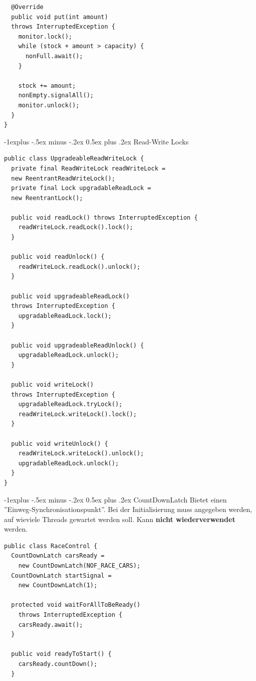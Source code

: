 \documentclass[a4paper, fontsize=6pt]{scrartcl}
\makeatletter
\renewcommand{\subsection}{\@startsection{subsection}{2}{0mm}%
    {-1explus -.5ex minus -.2ex}%
    {0.5ex plus .2ex}%
    {\normalfont\normalsize\bfseries}}
\makeatother
\begin{document}
\begin{multicols*}{5}
\begin{verbatim}
  @Override
  public void put(int amount) 
  throws InterruptedException {
    monitor.lock();
    while (stock + amount > capacity) {
      nonFull.await();
    }

    stock += amount;
    nonEmpty.signalAll();
    monitor.unlock();
  }
}
\end{verbatim}

\subsection{Read-Write Locks}
\begin{verbatim}
public class UpgradeableReadWriteLock {
  private final ReadWriteLock readWriteLock =
  new ReentrantReadWriteLock();
  private final Lock upgradableReadLock = 
  new ReentrantLock();

  public void readLock() throws InterruptedException {
    readWriteLock.readLock().lock();
  }

  public void readUnlock() {
    readWriteLock.readLock().unlock();
  }

  public void upgradeableReadLock() 
  throws InterruptedException {
    upgradableReadLock.lock();
  }

  public void upgradeableReadUnlock() {
    upgradableReadLock.unlock();
  }

  public void writeLock() 
  throws InterruptedException {
    upgradableReadLock.tryLock();
    readWriteLock.writeLock().lock();
  }

  public void writeUnlock() {
    readWriteLock.writeLock().unlock();
    upgradableReadLock.unlock();
  }
}
\end{verbatim}

\subsection{CountDownLatch}
Bietet einen ''Einweg-Synchronisationspunkt''. Bei der Initialisierung muss angegeben werden, auf wieviele Threads gewartet werden soll. Kann \textbf{nicht wiederverwendet} werden.

\begin{verbatim}
public class RaceControl {
  CountDownLatch carsReady = 
    new CountDownLatch(NOF_RACE_CARS);
  CountDownLatch startSignal = 
    new CountDownLatch(1);

  protected void waitForAllToBeReady() 
    throws InterruptedException {
    carsReady.await();
  }

  public void readyToStart() {
    carsReady.countDown();
  }


\end{verbatim}
\end{multicols*}
\end{document}
